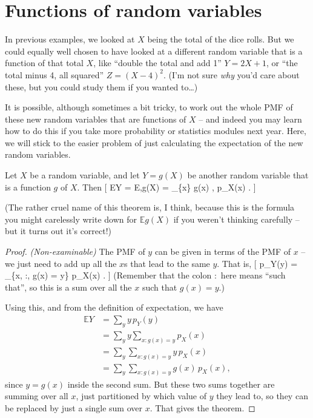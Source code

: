 \documentclass[
  letterpaper,
  DIV=11,
  numbers=noendperiod]{scrreprt}
\theoremstyle{remark}
\begin{document}
\hypertarget{functions}{%
\section{Functions of random variables}\label{functions}}

In previous examples, we looked at \(X\) being the total of the dice
rolls. But we could equally well chosen to have looked at a different
random variable that is a function of that total \(X\), like ``double
the total and add 1'' \(Y = 2X + 1\), or ``the total minus 4, all
squared'' \(Z = (X-4)^2\). (I'm not sure \emph{why} you'd care about
these, but you could study them if you wanted to\ldots)

It is possible, although sometimes a bit tricky, to work out the whole
PMF of these new random variables that are functions of \(X\) -- and
indeed you may learn how to do this if you take more probability or
statistics modules next year. Here, we will stick to the easier problem
of just calculating the expectation of the new random variables.

\leavevmode{}%
Let \(X\) be a random variable, and let \(Y = g(X)\) be another random
variable that is a function \(g\) of \(X\). Then {[} \mathbb EY =
\mathbb E,g(X) = \sum\_\{x\} g(x) , p\_X(x) . {]}

(The rather cruel name of this theorem is, I think, because this is the
formula you might carelessly write down for \(\mathbb Eg(X)\) if you
weren't thinking carefully -- but it turns out it's correct!)

\begin{proof}

\emph{(Non-examinable)} The PMF of \(y\) can be given in terms of the
PMF of \(x\) -- we just need to add up all the \(x\)s that lead to the
same \(y\). That is, {[} p\_Y(y) = \sum\_\{x, :, g(x) = y\} p\_X(x) .
{]} (Remember that the colon \(:\) here means ``such that'', so this is
a sum over all the \(x\) such that \(g(x) = y\).)

Using this, and from the definition of expectation, we have
\begin{align*}
  \mathbb EY &= \sum_y y \, p_Y(y) \\
    &= \sum_y y \sum_{x : g(x) = y} p_X(x) \\
    &= \sum_y \sum_{x : g(x) = y} y\,p_X(x) \\
    &= \sum_y \sum_{x : g(x) = y} g(x) \, p_X(x) ,
\end{align*} since \(y = g(x)\) inside the second sum. But these two
sums together are summing over all \(x\), just partitioned by which
value of \(y\) they lead to, so they can be replaced by just a single
sum over \(x\). That gives the theorem.

\end{proof}
\end{document}
